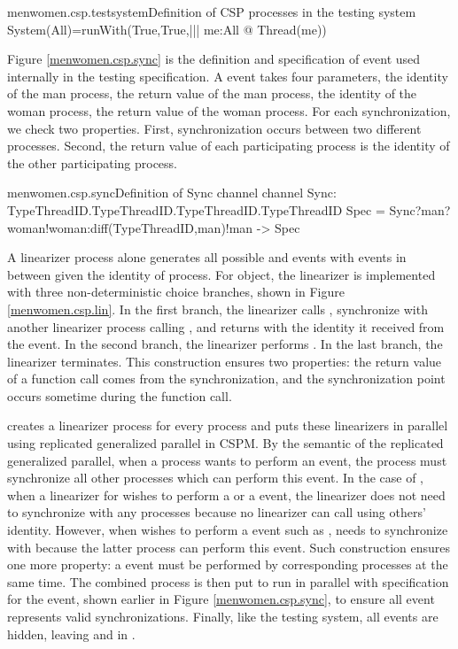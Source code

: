 \documentclass[a4paper, 12pt]{article}
\begin{document}
\begin{cspinline}{menwomen.csp.testsystem}{Definition of CSP processes in the testing system}
System(All)=runWith(True,True,||| me:All @ Thread(me))
\end{cspinline}

Figure \ref{menwomen.csp.sync} is the definition and specification of  event used internally in the testing specification. A  event takes four parameters, the identity of the man process, the return value of the man process, the identity of the woman process, the return value of the woman process. For each synchronization, we check two properties. First, synchronization occurs between two different processes. Second, the return value of each participating process is the identity of the other participating process. 

\begin{cspinline}{menwomen.csp.sync}{Definition of Sync channel}
channel Sync: TypeThreadID.TypeThreadID.TypeThreadID.TypeThreadID
Spec = Sync?man?woman!woman:diff(TypeThreadID,{man})!man -> Spec
\end{cspinline}

A linearizer process alone generates all possible  and  events with  events in between given the identity of process. For  object, the linearizer is implemented with three non-deterministic choice branches, shown in Figure \ref{menwomen.csp.lin}. In the first branch, the linearizer calls , synchronize with another linearizer process calling , and returns with the identity it received from the  event. In the second branch, the linearizer performs . In the last branch, the linearizer terminates. This construction ensures two properties: the return value of a function call comes from the synchronization, and the synchronization point occurs sometime during the function call. 

 creates a linearizer process for every process and puts these linearizers in parallel using replicated generalized parallel in CSPM. By the semantic of the replicated generalized parallel, when a process wants to perform an event, the process must synchronize all other processes which can perform this event. In the case of , when a linearizer for  wishes to perform a  or a  event, the linearizer does not need to synchronize with any processes because no linearizer can call using others' identity. However, when  wishes to perform a  event such as ,  needs to synchronize with  because the latter process can perform this  event. Such construction ensures one more property: a  event must be performed by corresponding processes at the same time. The combined process is then put to run in parallel with specification for the  event, shown earlier in Figure \ref{menwomen.csp.sync}, to ensure all  event represents valid synchronizations. Finally, like the testing system, all  events are hidden, leaving  and  in .
\end{document}
